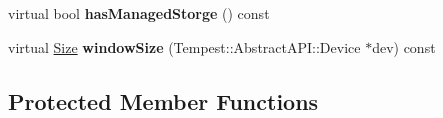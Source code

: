 \begin{DoxyCompactItemize}
\item 
\hypertarget{class_tempest_1_1_opengl2x_af72ccffb1d3eba2332ebeb5f3a99f3a6}{virtual bool {\bfseries has\+Managed\+Storge} () const }\label{class_tempest_1_1_opengl2x_af72ccffb1d3eba2332ebeb5f3a99f3a6}

\item 
\hypertarget{class_tempest_1_1_opengl2x_abe7e150ea8769669cfbd6973f70b3ece}{virtual \hyperlink{struct_tempest_1_1_size}{Size} {\bfseries window\+Size} (Tempest\+::\+Abstract\+A\+P\+I\+::\+Device $\ast$dev) const }\label{class_tempest_1_1_opengl2x_abe7e150ea8769669cfbd6973f70b3ece}

\end{DoxyCompactItemize}
\subsection*{Protected Member Functions}
